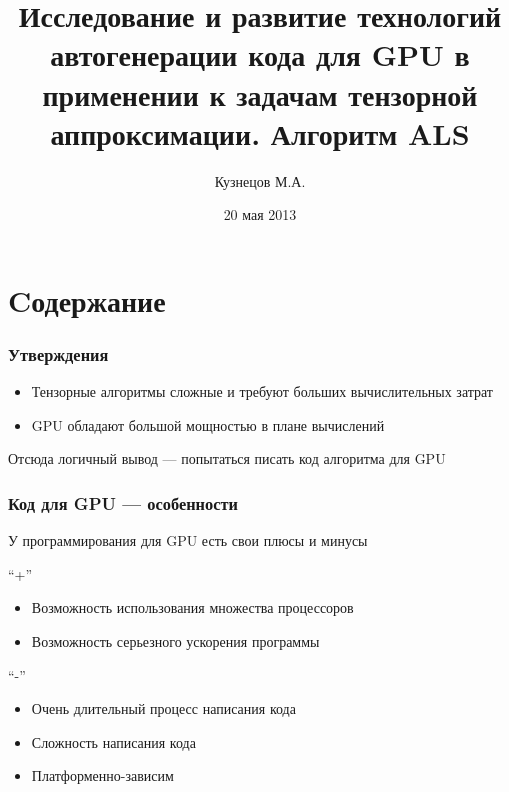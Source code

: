 \documentclass[presentation]{beamer}
\title{Исследование и развитие технологий автогенерации кода для GPU в применении к задачам тензорной аппроксимации. Алгоритм ALS}
\author{Кузнецов М.А.}
\date{20 мая 2013}
\begin{document}
\maketitle



\section{Cодержание}
\label{sec-1}
\begin{frame}
\frametitle{Утверждения}
\label{sec-1-1}

\begin{itemize}
\item Тензорные алгоритмы сложные и требуют больших вычислительных затрат
\item GPU обладают большой мощностью в плане вычислений
\end{itemize}
Отсюда логичный вывод --- попытаться писать код алгоритма для GPU
\end{frame}
\begin{frame}
\frametitle{Код для GPU --- особенности}
\label{sec-1-2}

У программирования для GPU есть свои плюсы и минусы

``+''
\begin{itemize}
\item Возможность использования множества процессоров
\item Возможность серьезного ускорения программы
\end{itemize}
``-''
\begin{itemize}
\item Очень длительный процесс написания кода
\item Сложность написания кода
\item Платформенно-зависим
\end{itemize}
\end{frame}
\end{document}
